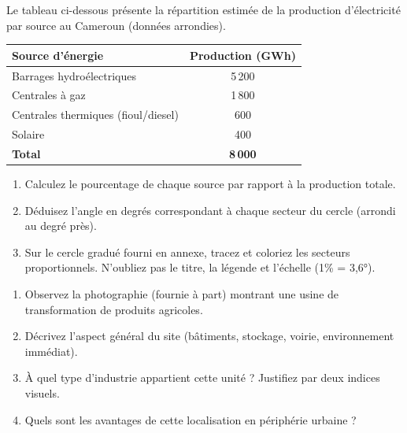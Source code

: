 \documentclass[11pt]{article}
\begin{document}
\begin{exercice} %
Le tableau ci-dessous présente la répartition estimée de la production d'électricité par source au Cameroun (données arrondies).

\begin{tabular}{|l|c|}
\hline
\textbf{Source d'énergie} & \textbf{Production (GWh)} \\
\hline
Barrages hydroélectriques & 5\,200 \\
\hline
Centrales à gaz & 1\,800 \\
\hline
Centrales thermiques (fioul/diesel) & 600 \\
\hline
Solaire & 400 \\
\hline
\textbf{Total} & \textbf{8\,000} \\
\hline
\end{tabular}

\begin{enumerate}
    \item Calculez le pourcentage de chaque source par rapport à la production totale.
    \item Déduisez l'angle en degrés correspondant à chaque secteur du cercle (arrondi au degré près).
    \item Sur le cercle gradué fourni en annexe, tracez et coloriez les secteurs proportionnels. N'oubliez pas le titre, la légende et l'échelle (1\% = 3,6°).
\end{enumerate}
\end{exercice}

\begin{exercice}
\begin{enumerate}
    \item Observez la photographie (fournie à part) montrant une usine de transformation de produits agricoles.
    \item Décrivez l'aspect général du site (bâtiments, stockage, voirie, environnement immédiat).
    \item À quel type d'industrie appartient cette unité ? Justifiez par deux indices visuels.
    \item Quels sont les avantages de cette localisation en périphérie urbaine ?
\end{enumerate}
\end{exercice}
\end{document}
